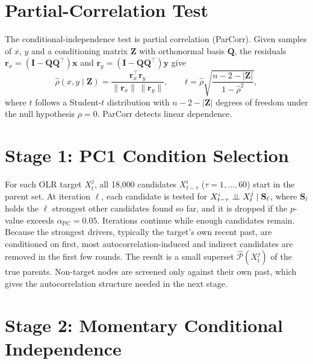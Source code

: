 \section{Partial-Correlation Test}
\label{sec:pcmci-parcorr}

The conditional-independence test is partial correlation (ParCorr). Given samples of $x$, $y$ and a conditioning matrix $\mathbf{Z}$ with orthonormal basis $\mathbf{Q}$, the residuals $\mathbf{r}_x=(\mathbf{I}-\mathbf{Q}\mathbf{Q}^\top)\mathbf{x}$ and $\mathbf{r}_y=(\mathbf{I}-\mathbf{Q}\mathbf{Q}^\top)\mathbf{y}$ give
\begin{equation}
  \hat\rho(x,y\mid\mathbf{Z})=\frac{\mathbf{r}_x^{\top}\mathbf{r}_y}{\lVert\mathbf{r}_x\rVert\,\lVert\mathbf{r}_y\rVert},\qquad
  t=\hat\rho\sqrt{\frac{n-2-|\mathbf{Z}|}{1-\hat\rho^2}},
  \label{eq:parcorr}
\end{equation}
where $t$ follows a Student-$t$ distribution with $n-2-|\mathbf{Z}|$ degrees of freedom under the null hypothesis $\rho=0$. ParCorr detects linear dependence.

\section{Stage 1: PC1 Condition Selection}
\label{sec:pcmci-pc1}

For each OLR target $X^j_t$, all 18{,}000 candidates $X^i_{t-\tau}$ ($\tau=1,\dots,60$) start in the parent set. At iteration $\ell$, each candidate is tested for $X^i_{t-\tau}\mathrel{\perp\!\!\!\perp} X^j_t\mid\mathbf{S}_\ell$, where $\mathbf{S}_\ell$ holds the $\ell$ strongest other candidates found so far, and it is dropped if the $p$-value exceeds $\alpha_{\mathrm{PC}}=0.05$. Iterations continue while enough candidates remain. Because the strongest drivers, typically the target's own recent past, are conditioned on first, most autocorrelation-induced and indirect candidates are removed in the first few rounds. The result is a small superset $\hat{\mathcal{P}}(X^j_t)$ of the true parents. Non-target nodes are screened only against their own past, which gives the autocorrelation structure needed in the next stage.

\section{Stage 2: Momentary Conditional Independence}
\label{sec:pcmci-mci}

